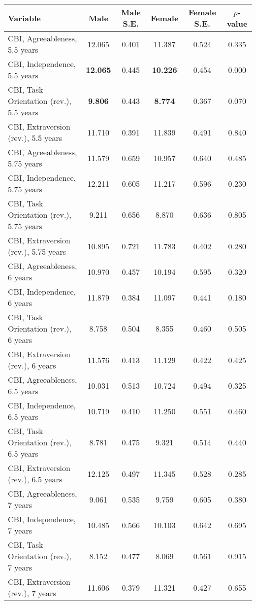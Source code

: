 \begin{tabular}{l c c c c c}
\toprule
\textbf{Variable} & \textbf{Male} & \textbf{Male S.E.}  & \textbf{Female} & \textbf{Female S.E.} & \textbf{$ p $-value} \\
\midrule
CBI, Agreeableness, 5.5 years & 12.065 & 0.401 &  11.387 & 0.524 & 0.335 \\
CBI, Independence, 5.5 years & \textbf{12.065} & 0.445 &  \textbf{10.226} & 0.454 & 0.000 \\
CBI, Task Orientation (rev.), 5.5 years & \textbf{9.806} & 0.443 &  \textbf{8.774} & 0.367 & 0.070 \\
CBI, Extraversion (rev.), 5.5 years & 11.710 & 0.391 &  11.839 & 0.491 & 0.840 \\
CBI, Agreeableness, 5.75 years & 11.579 & 0.659 &  10.957 & 0.640 & 0.485 \\
CBI, Independence, 5.75 years & 12.211 & 0.605 &  11.217 & 0.596 & 0.230 \\
CBI, Task Orientation (rev.), 5.75 years & 9.211 & 0.656 &  8.870 & 0.636 & 0.805 \\
CBI, Extraversion (rev.), 5.75 years & 10.895 & 0.721 &  11.783 & 0.402 & 0.280 \\
CBI, Agreeableness, 6 years & 10.970 & 0.457 &  10.194 & 0.595 & 0.320 \\
CBI, Independence, 6 years & 11.879 & 0.384 &  11.097 & 0.441 & 0.180 \\
CBI, Task Orientation (rev.), 6 years & 8.758 & 0.504 &  8.355 & 0.460 & 0.505 \\
CBI, Extraversion (rev.), 6 years & 11.576 & 0.413 &  11.129 & 0.422 & 0.425 \\
CBI, Agreeableness, 6.5 years & 10.031 & 0.513 &  10.724 & 0.494 & 0.325 \\
CBI, Independence, 6.5 years & 10.719 & 0.410 &  11.250 & 0.551 & 0.460 \\
CBI, Task Orientation (rev.), 6.5 years & 8.781 & 0.475 &  9.321 & 0.514 & 0.440 \\
CBI, Extraversion (rev.), 6.5 years & 12.125 & 0.497 &  11.345 & 0.528 & 0.285 \\
CBI, Agreeableness, 7 years & 9.061 & 0.535 &  9.759 & 0.605 & 0.380 \\
CBI, Independence, 7 years & 10.485 & 0.566 &  10.103 & 0.642 & 0.695 \\
CBI, Task Orientation (rev.), 7 years & 8.152 & 0.477 &  8.069 & 0.561 & 0.915 \\
CBI, Extraversion (rev.), 7 years & 11.606 & 0.379 &  11.321 & 0.427 & 0.655 \\

\end{tabular}
